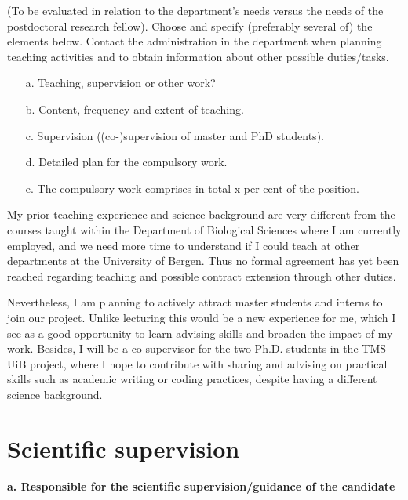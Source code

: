 \documentclass{article}
\newcommand{\guideline}[1]{{\color{color2}\itshape{#1}}}
\begin{document}
    \guideline{
        (To be evaluated in relation to the department’s needs versus the needs
        of the postdoctoral research fellow). Choose and specify (preferably
        several of) the elements below. Contact the administration in the
        department when planning teaching activities and to obtain information
        about other possible duties/tasks.

        \begin{itemize}
          \item[a.] Teaching, supervision or other work?
          \item[b.] Content, frequency and extent of teaching.
          \item[c.] Supervision ((co-)supervision of master and PhD students).
          \item[d.] Detailed plan for the compulsory work.
          \item[e.] The compulsory work comprises in total x per cent of the position.
        \end{itemize}}

    My prior teaching experience and science background are very different from
    the courses taught within the Department of Biological Sciences where I am
    currently employed, and we need more time to understand if I could teach
    at other departments at the University of Bergen. Thus no formal agreement
    has yet been reached regarding teaching and possible contract extension
    through other duties.

    Nevertheless,
    I am planning to actively attract master students and interns to join our
    project. Unlike lecturing this would be a new experience for me, which I
    see as a good opportunity to learn advising skills and broaden the impact
    of my work. Besides, I will be a co-supervisor for the two Ph.D. students
    in the TMS-UiB project, where I hope to contribute with sharing and
    advising on practical skills such as academic writing or coding practices,
    despite having a different science background.

\section{Scientific supervision}

    \textbf{a. Responsible for the scientific supervision/guidance of the
            candidate}
\end{document}
